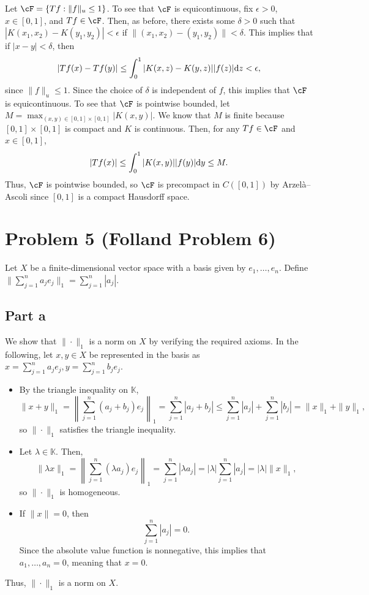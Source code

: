 \documentclass{article}
\begin{document}
Let $\cF=\{Tf:\|f\|_u\leq1\}$. To see that $\cF$ is equicontinuous, fix $\epsilon>0$, $x\in[0,1]$, and $Tf\in\cF$. Then, as before, there exists some $\delta>0$ such that $|K(x_1,x_2)-K(y_1,y_2)|<\epsilon$ if $\|(x_1,x_2)-(y_1,y_2)\|<\delta$. This implies that if $|x-y|<\delta$, then
\begin{align*}
	|Tf(x)-Tf(y)|\leq\int_0^1|K(x,z)-K(y,z)||f(z)|\mathrm{d} z<\epsilon,
\end{align*}
since $\|f\|_u\leq1$. Since the choice of $\delta$ is independent of $f$, this implies that $\cF$ is equicontinuous. To see that $\cF$ is pointwise bounded, let $M=\max_{(x,y)\in[0,1]\times[0,1]}|K(x,y)|$. We know that $M$ is finite because $[0,1]\times[0,1]$ is compact and $K$ is continuous. Then, for any $Tf\in\cF$ and $x\in[0,1]$,
\[
|Tf(x)|\leq\int_0^1|K(x,y)||f(y)|\mathrm{d} y\leq M.
\]
Thus, $\cF$ is pointwise bounded, so $\cF$ is precompact in $C([0,1])$ by Arzel\`a--Ascoli since $[0,1]$ is a compact Hausdorff space.

\section{Problem 5 (Folland Problem 6)}
Let $X$ be a finite-dimensional vector space with a basis given by $e_1,\ldots,e_n$. Define $\|\sum_{j=1}^na_je_j\|_1=\sum_{j=1}^n|a_j|$.

\subsection{Part a}
We show that $\|\cdot\|_1$ is a norm on $X$ by verifying the required axioms. In the following, let $x,y\in X$ be represented in the basis as $x=\sum_{j=1}^na_je_j, y=\sum_{j=1}^nb_je_j$.
\begin{itemize}
	\item By the triangle inequality on $\mathbb{K}$, 
	\[
	\|x+y\|_1=\left\|\sum_{j=1}^n(a_j+b_j)e_j\right\|_1=\sum_{j=1}^n|a_j+b_j|\leq\sum_{j=1}^n|a_j|+\sum_{j=1}^n|b_j|=\|x\|_1+\|y\|_1,
	\]
	so $\|\cdot\|_1$ satisfies the triangle inequality.
	\item Let $\lambda\in\mathbb{K}$. Then,
	\[
	\|\lambda x\|_1=\left\|\sum_{j=1}^n(\lambda a_j)e_j\right\|_1=\sum_{j=1}^n|\lambda a_j|=|\lambda|\sum_{j=1}^n|a_j|=|\lambda|\|x\|_1,
	\]
	so $\|\cdot\|_1$ is homogeneous. 
	\item If $\|x\|=0$, then 
	\[
	\sum_{j=1}^n|a_j|=0.
	\]
	Since the absolute value function is nonnegative, this implies that $a_1,\ldots,a_n=0$, meaning that $x=0$. 
\end{itemize}
Thus, $\|\cdot\|_1$ is a norm on $X$.
\end{document}
